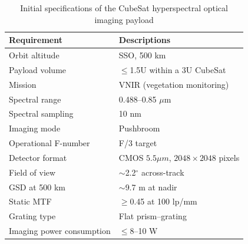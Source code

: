 \documentclass{iac}
\begin{document}
\begin{table}[h!]
	\small
	\centering
	\caption{Initial specifications of the CubeSat hyperspectral optical imaging           payload}
	\label{table:hsispecs}
	\begin{threeparttable}
		\begin{tabularx}{\linewidth}{l X}
			\toprule\toprule
			\textbf{Requirement} & \textbf{Descriptions} \\ 
			\midrule
			Orbit altitude & SSO, 500 km \\
			Payload volume & \(\leq\)1.5U within a 3U CubeSat \\
			Mission & VNIR (vegetation monitoring) \\
			Spectral range & 0.488--0.85 $\mu$m \\
			Spectral sampling & 10 nm \\
			Imaging mode & Pushbroom\\
			Operational F-number & F/3 target \\
			Detector format & CMOS $5.5 \mu m$, $2048 \times 2048$ pixels \\
			Field of view & $\sim$2.2$^\circ$ across-track \\
			GSD at 500 km & $\sim$9.7 m at nadir \\
			Static MTF & $\geq$0.45 at 100 lp/mm \\
			Grating type & Flat prism--grating  \\
			Imaging power consumption & $\leq$8--10 W \\
			\bottomrule\bottomrule
		\end{tabularx}
	\end{threeparttable}
\end{table}
\end{document}
